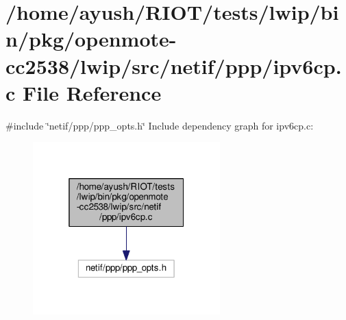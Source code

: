 \hypertarget{openmote-cc2538_2lwip_2src_2netif_2ppp_2ipv6cp_8c}{}\section{/home/ayush/\+R\+I\+O\+T/tests/lwip/bin/pkg/openmote-\/cc2538/lwip/src/netif/ppp/ipv6cp.c File Reference}
\label{openmote-cc2538_2lwip_2src_2netif_2ppp_2ipv6cp_8c}
{\ttfamily \#include \char`\"{}netif/ppp/ppp\+\_\+opts.\+h\char`\"{}}\newline
Include dependency graph for ipv6cp.\+c\+:
\nopagebreak
\begin{figure}[H]
\begin{center}
\leavevmode
\includegraphics[width=205pt]{openmote-cc2538_2lwip_2src_2netif_2ppp_2ipv6cp_8c__incl}
\end{center}
\end{figure}
